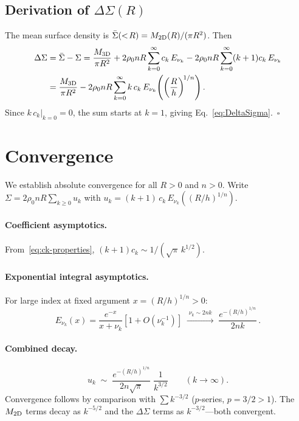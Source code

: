 \documentclass{article}
\begin{document}
\subsection{Derivation of $\Delta\Sigma(R)$}

The mean surface density is $\bar\Sigma(<\!R)=M_{\rm 2D}(R)/(\pi R^2)$.  Then
\begin{align}
\Delta\Sigma &= \bar\Sigma - \Sigma
= \frac{M_{\rm 3D}}{\pi R^2}
+ 2\rho_0 nR\sum_{k=0}^{\infty}c_k\,E_{\nu_k}
- 2\rho_0 nR\sum_{k=0}^{\infty}(k+1)c_k\,E_{\nu_k} \nonumber\\
&= \frac{M_{\rm 3D}}{\pi R^2}
- 2\rho_0 nR\sum_{k=0}^{\infty}k\,c_k\,E_{\nu_k}\!\left(\left(\frac{R}{h}\right)^{\!1/n}\right).
\end{align}
Since $k\,c_k|_{k=0}=0$, the sum starts at $k=1$, giving
Eq.~\eqref{eq:DeltaSigma}.~$\square$

\section{Convergence}
\label{sec:convergence}

We establish absolute convergence for all $R>0$ and $n>0$.  Write
$\Sigma = 2\rho_0 nR\sum_{k\ge0}u_k$ with
$u_k = (k+1)\,c_k\,E_{\nu_k}((R/h)^{1/n})$.

\paragraph{Coefficient asymptotics.}
From~\eqref{eq:ck-properties}, $(k+1)c_k\sim 1/(\sqrt\pi\,k^{1/2})$.

\paragraph{Exponential integral asymptotics.}
For large index at fixed argument $x=(R/h)^{1/n}>0$:
\begin{equation}
E_{\nu_k}(x) = \frac{e^{-x}}{x+\nu_k}\left[1+O(\nu_k^{-1})\right]
\;\xrightarrow{\;\nu_k\sim 2nk\;}\;
\frac{e^{-(R/h)^{1/n}}}{2nk}\,.
\end{equation}

\paragraph{Combined decay.}
\begin{equation}
u_k \;\sim\; \frac{e^{-(R/h)^{1/n}}}{2n\sqrt\pi}\;\frac{1}{k^{3/2}}
\qquad (k\to\infty).
\end{equation}
Convergence follows by comparison with $\sum k^{-3/2}$ ($p$-series, $p=3/2>1$).
The $M_{\rm 2D}$ terms decay as $k^{-5/2}$ and the $\Delta\Sigma$ terms as
$k^{-3/2}$---both convergent.
\end{document}
